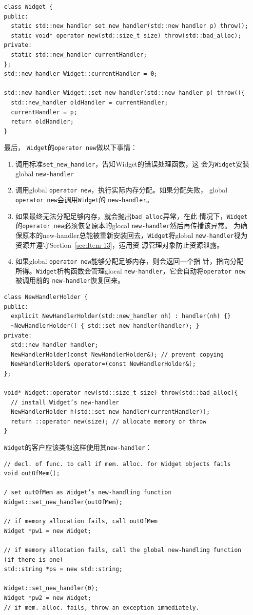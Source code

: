 \begin{verbatim}
class Widget {
public:
  static std::new_handler set_new_handler(std::new_handler p) throw();
  static void* operator new(std::size_t size) throw(std::bad_alloc);
private:
  static std::new_handler currentHandler;
};
std::new_handler Widget::currentHandler = 0;

std::new_handler Widget::set_new_handler(std::new_handler p) throw(){
  std::new_handler oldHandler = currentHandler;
  currentHandler = p;
  return oldHandler;
}
\end{verbatim}
最后， \texttt{Widget}的\texttt{operator new}做以下事情：
\begin{enumerate}
\item 调用标准\texttt{set\_new\_handler}，告知Widget的错误处理函数，这
  会为\texttt{Widget}安装global \texttt{new-handler}
\item 调用global \texttt{operator new}，执行实际内存分配。如果分配失败，
  global \texttt{operator new}会调用\texttt{Widget}的
  \texttt{new-handler}。
\item 如果最终无法分配足够内存，就会抛出\texttt{bad\_alloc}异常，在此
  情况下，\texttt{Widget}的\texttt{operator new}必须恢复原本的glocal
  \texttt{new-handler}然后再传播该异常。 
  为确保原本的new-handler总能被重新安装回去，\texttt{Widget}将global
  \texttt{new-handler}视为资源并遵守Section~\ref{sec:Item-13}，运用资
  源管理对象防止资源泄露。
\item 如果global \texttt{operator new}能够分配足够内存，则会返回一个指
  针，指向分配所得。\texttt{Widget}析构函数会管理glocal
  \texttt{new-handler}，它会自动将\texttt{operator new}被调用前的
  \texttt{new-handler}恢复回来。
\end{enumerate}

\begin{verbatim}
class NewHandlerHolder {
public:
  explicit NewHandlerHolder(std::new_handler nh) : handler(nh) {}
  ~NewHandlerHolder() { std::set_new_handler(handler); }
private:
  std::new_handler handler;
  NewHandlerHolder(const NewHandlerHolder&); // prevent copying
  NewHandlerHolder& operator=(const NewHandlerHolder&);
};

void* Widget::operator new(std::size_t size) throw(std::bad_alloc){
  // install Widget’s new-handler
  NewHandlerHolder h(std::set_new_handler(currentHandler)); 
  return ::operator new(size); // allocate memory or throw
}
\end{verbatim}

\texttt{Widget}的客户应该类似这样使用其\texttt{new-handler}：
\begin{verbatim}
// decl. of func. to call if mem. alloc. for Widget objects fails
void outOfMem(); 

/ set outOfMem as Widget’s new-handling function
Widget::set_new_handler(outOfMem);

// if memory allocation fails, call outOfMem
Widget *pw1 = new Widget; 

// if memory allocation fails, call the global new-handling function (if there is one)
std::string *ps = new std::string; 

Widget::set_new_handler(0);
Widget *pw2 = new Widget; 
// if mem. alloc. fails, throw an exception immediately.
\end{verbatim}

